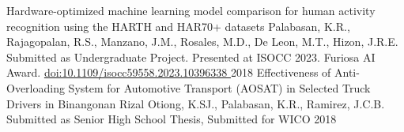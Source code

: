 \documentclass[9pt]{developercv}
\begin{document}
\begin{minipage}[t]{0.475\textwidth}
\begin{entrylist}
			{Hardware-optimized machine learning model comparison for human activity recognition using the HARTH and HAR70+ datasets}
			{Palabasan, K.R., Rajagopalan, R.S., Manzano, J.M., Rosales, M.D., De Leon, M.T., Hizon, J.R.E.}
			{Submitted as Undergraduate Project. Presented at ISOCC 2023. Furiosa AI Award. \href{https://dx.doi.org/10.1109/isocc59558.2023.10396338}{doi:10.1109/isocc59558.2023.10396338 }}
		\entry
			{2018}
			{Effectiveness of Anti-Overloading System for Automotive Transport (AOSAT) in Selected Truck Drivers in Binangonan Rizal}
			{Otiong, K.SJ., Palabasan, K.R., Ramirez, J.C.B.}
			{Submitted as Senior High School Thesis, Submitted for WICO 2018}
	\end{entrylist}

\end{minipage}
\hfill 
\end{document}

